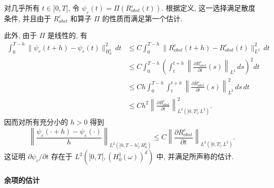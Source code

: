 \begin{sloppypar}
\begin{Proof}
对几乎所有 $t\in]0,T[$, 令 $\psi_\varepsilon(t)=\Pi(R_{obst}^\varepsilon(t))$. 根据定义, 这一选择满足散度条件, 并且由于 $R_{obst}^\varepsilon$ 和算子 $\Pi$ 的性质而满足第一个估计.

此外, 由于 $\Pi$ 是线性的, 有
\[
\begin{split}
 \int_0^{T-h}\|\psi_\varepsilon(t+h)-\psi_\varepsilon(t)\|_{H_0^1}^2\,dt
 &\leq C\int_0^{T-h}\|R_{obst}^\varepsilon(t+h)-R_{obst}^\varepsilon(t)\|_{L^2}^2\,dt\\
 &\leq C\int_0^{T-h}\left(\int_t^{t+h}
 \left\|\frac{\partial R_{obst}^\varepsilon}{\partial t}(s)\right\|_{L^2}\,ds\right)^2dt\\
 &\leq Ch\int_0^{T-h}\int_t^{t+h}
 \left\|\frac{\partial R_{obst}^\varepsilon}{\partial t}(s)\right\|_{L^2}^2\,ds\,dt\\
 &\leq Ch^2\left\|\frac{\partial R_{obst}^\varepsilon}{\partial t}\right\|_{L^2(]0,T[,L^2)}^2.
\end{split}
\]
因而对所有充分小的 $h>0$ 得到
\[
 \left\|\frac{\psi_\varepsilon(\cdot+h)-\psi_\varepsilon(\cdot)}h\right\|_{L^2(]0,T-h[,H_0^1)}
 \leq C\left\|\frac{\partial R_{obst}^\varepsilon}{\partial t}\right\|_{L^2(]0,T[,L^2)}.
\]
这证明 $\partial\psi_\varepsilon/\partial t$ 存在于 $L^2(]0,T[,(H_0^1(\omega))^d)$ 中, 并满足所声称的估计.
\end{Proof}

\paragraph{余项的估计}
\label{subsubsec:chap7-remainder-estimates}


\end{sloppypar}
